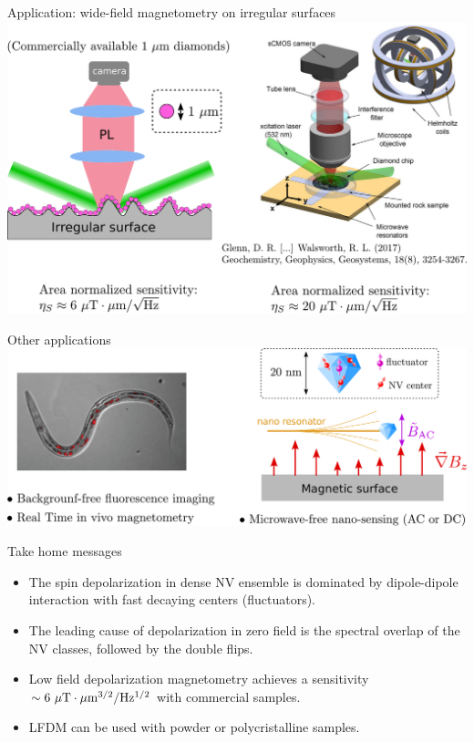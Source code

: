 \documentclass{beamer}
\begin{document}
\begin{frame}{Application: wide-field magnetometry on irregular surfaces}
\centering
\includegraphics[width=\textwidth,height=0.9\textheight,keepaspectratio]{Slide_applications_wide_field}
\end{frame}

\begin{frame}{Other applications}
\centering
\includegraphics[width=\textwidth,height=0.9\textheight,keepaspectratio]{Slide_application_autre}
\end{frame}

\begin{frame}{Take home messages}
\begin{itemize}
\item The spin depolarization in dense NV ensemble is dominated by dipole-dipole interaction with fast decaying centers (fluctuators).
\medskip
\item The leading cause of depolarization in zero field is the spectral overlap of the NV classes, followed by the double flips.
\medskip
\item Low field depolarization magnetometry achieves a sensitivity $\sim 6\ \mu\rm T \cdot \mu \rm m^{3/2} / Hz^{1/2}$ with commercial samples.
\medskip
\item LFDM can be used with powder or polycristalline samples.
\end{itemize}

\end{frame}
\end{document}

